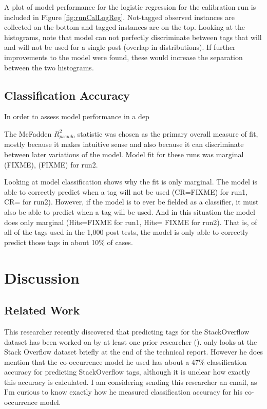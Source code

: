 \documentclass[10pt,letterpaper]{article}
\begin{document}
A plot of model performance for the logistic regression for the calibration run is included in Figure \ref{fig:runCalLogReg}.
Not-tagged observed instances are collected on the bottom and tagged instances are on the top.
Looking at the histograms, note that model can not perfectly discriminate between tags that will and will not be used for a single post (overlap in distributions).
If further improvements to the model were found, these would increase the separation between the two histograms.

\subsection{Classification Accuracy}

In order to assess model performance in a dep

The McFadden $R_{pseudo}^{2}$ statistic was chosen as the primary overall measure of fit, mostly because it makes intuitive sense and also because it can discriminate between later variations of the model.
Model fit for these runs was marginal (FIXME), (FIXME) for run2.

Looking at model classification shows why the fit is only marginal.
The model is able to correctly predict when a tag will not be used (CR=FIXME) for run1, CR= for run2).
However, if the model is to ever be fielded as a classifier, it must also be able to predict when a tag will be used.
And in this situation the model does only marginal (Hits=FIXME for run1, Hits= FIXME for run2).
That is, of all of the tags used in the 1,000 post tests, the model is only able to correctly predict those tags in about 10\% of cases.

\section{Discussion}

\subsection{Related Work}
This researcher recently discovered that predicting tags for the StackOverflow dataset has been worked on by at least one prior researcher (\cite{Kuo2011}).
\cite{Kuo2011} only looks at the Stack Overflow dataset briefly at the end of the technical report.
However he does mention that the co-occurrence model he used has about a 47\% classification accuracy for predicting StackOverflow tags, although it is unclear how exactly this accuracy is calculated.
I am considering sending this researcher an email, as I'm curious to know exactly how he measured classification accuracy for his co-occurrence model.
\end{document}
